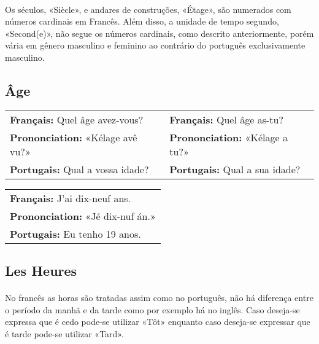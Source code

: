 \documentclass{article}
\begin{document}
        \paragraph{} Os séculos, «Siècle», e andares de construções, «Étage», são numerados com números cardinais em Francês. Além disso, a unidade de tempo segundo, «Second(e)», não segue os números cardinais, como descrito anteriormente, porém vária em gênero masculino e feminino ao contrário do português exclusivamente masculino.
            
    \subsection{Âge}
        \begin{center}
            \begin{tabular}{m{8cm} m{8cm}}
                \textbf{Français:}      Quel âge avez-vous? & \textbf{Français:}      Quel âge as-tu?\\
                \textbf{Prononciation:} «Kélage avê vu?»    & \textbf{Prononciation:} «Kélage a tu?»\\
                \textbf{Portugais:}     Qual a vossa idade? & \textbf{Portugais:}     Qual a sua idade?\\
            \end{tabular}
        \end{center}

        \begin{center}
            \begin{tabular}{l}
                \textbf{Français:}      J’ai dix-neuf ans.\\
                \textbf{Prononciation:} «Jé dix-nuf án.»\\
                \textbf{Portugais:}     Eu tenho 19 anos.\\
            \end{tabular}
        \end{center}
    
    \subsection{Les Heures}
        \paragraph{}No francês as horas são tratadas assim como no português, não há diferença entre o período da manhã e da tarde como por exemplo há no inglês. Caso deseja-se expressa que é cedo pode-se utilizar «Tôt» enquanto caso deseja-se expressar que é tarde pode-se utilizar «Tard».
            
\end{document}

